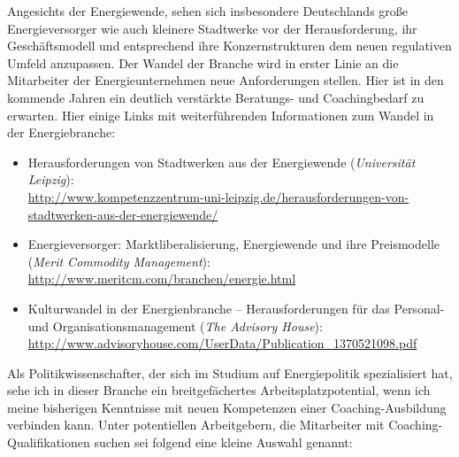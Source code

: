 \documentclass[11pt,a4paper]{article}
\begin{document}
Angesichts der Energiewende, sehen sich insbesondere Deutschlands große Energieversorger wie auch kleinere Stadtwerke vor der Herausforderung, ihr Geschäftsmodell und entsprechend ihre Konzernstrukturen dem neuen regulativen Umfeld anzupassen. Der Wandel der Branche wird in erster Linie an die Mitarbeiter der Energieunternehmen neue Anforderungen stellen. Hier ist in den kommende Jahren ein deutlich verstärkte Beratungs- und Coachingbedarf zu erwarten. Hier einige Links mit weiterführenden Informationen zum Wandel in der Energiebranche:

	\begin{itemize}
	\item Herausforderungen von Stadtwerken aus der Energiewende (\textsl{Universität Leipzig}):\\
	\textsf{\textcolor{MidnightBlue}{\url{http://www.kompetenzzentrum-uni-leipzig.de/herausforderungen-von-stadtwerken-aus-der-energiewende/}}}

	\item Energieversorger: Marktliberalisierung, Energiewende und ihre Preismodelle (\textsl{Merit Commodity Management}):\\
	\textsf{\textcolor{MidnightBlue}{\url{http://www.meritcm.com/branchen/energie.html}}}

	\item Kulturwandel in der Energienbranche -- Herausforderungen für das Personal- und Organisationsmanagement (\textsl{The Advisory House}):\\
	\textsf{\textcolor{MidnightBlue}{\url{http://www.advisoryhouse.com/UserData/Publication_1370521098.pdf}}}
	\end{itemize}
	
Als Politikwissenschafter, der sich im Studium auf Energiepolitik spezialisiert hat, sehe ich in dieser Branche ein breitgefächertes Arbeitsplatzpotential, wenn ich meine bisherigen Kenntnisse mit neuen Kompetenzen einer Coaching-Ausbildung verbinden kann. Unter potentiellen Arbeitgebern, die Mitarbeiter mit Coaching-Qualifikationen suchen sei folgend eine kleine Auswahl genannt:
\end{document}
